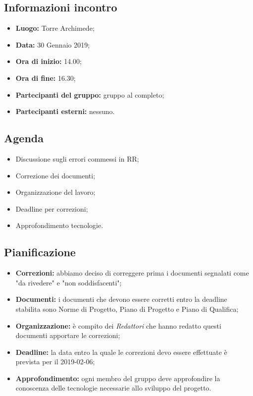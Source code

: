 \subsection{Informazioni incontro}
\begin{itemize}
	\item { \textbf{Luogo:} Torre Archimede};
	\item { \textbf{Data:} 30 Gennaio 2019};
	\item { \textbf{Ora di inizio:} 14.00};
	\item { \textbf{Ora di fine:} 16.30};
	\item { \textbf{Partecipanti del gruppo:} gruppo al completo};
	\item { \textbf{Partecipanti esterni:} nessuno}.
\end{itemize}


\subsection{Agenda}
\begin{itemize}
	\item {Discussione sugli errori commessi in RR;}
	\item {Correzione dei documenti;}
	\item {Organizzazione del lavoro;}
	\item {Deadline per correzioni;}
	\item {Approfondimento tecnologie.}
\end{itemize}

\subsection{Pianificazione}
\begin{itemize}
	\item { \textbf{Correzioni:} abbiamo deciso di correggere prima i documenti segnalati come "da rivedere" e "non soddisfacenti";}
	\item{ \textbf{Documenti:} i documenti che devono essere corretti entro la deadline stabilita sono Norme di Progetto, Piano di Progetto e Piano di Qualifica;}
	\item { \textbf{Organizzazione:} è compito dei \emph{Redattori} che hanno redatto questi documenti apportare le correzioni; }	
	\item { \textbf{Deadline:} la data entro la quale le correzioni devo essere effettuate è prevista per il 2019-02-06;}
	\item { \textbf{Approfondimento:} ogni membro del gruppo deve approfondire la conoscenza delle tecnologie necessarie allo sviluppo del progetto.}
\end{itemize}

